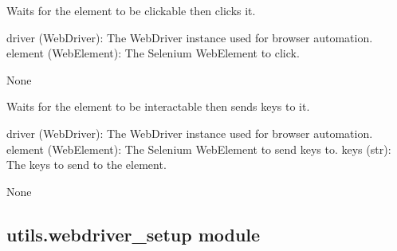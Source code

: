 \documentclass[letterpaper,10pt,english]{sphinxmanual}
\begin{document}
\begin{fulllineitems}
\label{\detokenize{utils:utils.user_management.wait_then_click}}
\pysigstartsignatures
{}
\pysigstopsignatures
\sphinxAtStartPar
Waits for the element to be clickable then clicks it.
\begin{description}
\sphinxAtStartPar
driver (WebDriver): The WebDriver instance used for browser automation.
element (WebElement): The Selenium WebElement to click.

\sphinxAtStartPar
None

\end{description}

\end{fulllineitems}


\begin{fulllineitems}
\label{\detokenize{utils:utils.user_management.wait_then_send_keys}}
\pysigstartsignatures
{}
\pysigstopsignatures
\sphinxAtStartPar
Waits for the element to be interactable then sends keys to it.
\begin{description}
\sphinxAtStartPar
driver (WebDriver): The WebDriver instance used for browser automation.
element (WebElement): The Selenium WebElement to send keys to.
keys (str): The keys to send to the element.

\sphinxAtStartPar
None

\end{description}

\end{fulllineitems}



\subsection{utils.webdriver\_setup module}
\label{\detokenize{utils:module-utils.webdriver_setup}}\label{\detokenize{utils:utils-webdriver-setup-module}}
\end{document}
